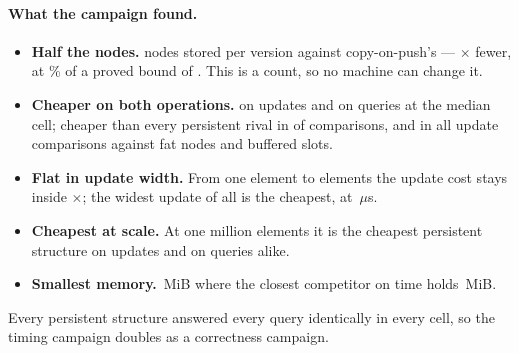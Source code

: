 \documentclass[11pt,a4paper]{article}
\begin{document}
\paragraph{What the campaign found.}
\begin{itemize}[leftmargin=1.4em,itemsep=1pt]
\item \textbf{Half the nodes.}  nodes stored per version
  against copy-on-push's  --- $\times$
  fewer, at \% of a proved bound of . This is
  a count, so no machine can change it.
\item \textbf{Cheaper on both operations.}  on updates
  and  on queries at the median cell; cheaper than every
  persistent rival in  of  comparisons, and in
  all  update comparisons against fat nodes and buffered
  slots.
\item \textbf{Flat in update width.} From one element to
   elements the update cost stays inside
  $\times$; the widest update of all is the cheapest, at
  \,$\mu$s.
\item \textbf{Cheapest at scale.} At one million elements it is the cheapest
  persistent structure on updates and on queries alike.
\item \textbf{Smallest memory.} \,MiB where the closest competitor
  on time holds \,MiB.
\end{itemize}

Every persistent structure answered every query identically in every cell, so the
timing campaign doubles as a correctness campaign.
\end{document}

